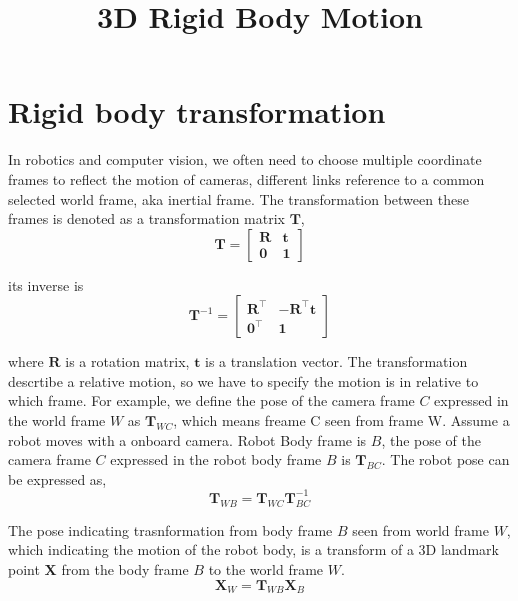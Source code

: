 \documentclass{article}
\title{3D Rigid Body Motion}
\author{}
\date{}
\begin{document}
\maketitle

\section{Rigid body transformation}
In robotics and computer vision, we often need to choose multiple coordinate frames to reflect the motion of cameras, 
different links reference to a common selected world frame, aka inertial frame. The transformation between these frames is denoted as a transformation matrix $\mathbf{T}$,
\begin{equation}
    \mathbf{T} = 
    \begin{bmatrix} 
    \mathbf{R} & \mathbf{t} \\
    \mathbf{0} & \mathbf{1}
    \end{bmatrix}  
\end{equation}

its inverse is
\begin{equation}
\mathbf{T}^{-1} = 
\begin{bmatrix}
\mathbf{R}^{\top} & -\mathbf{R}^{\top}\mathbf{t} \\
\mathbf{0}^{\top} & \mathbf{1}
\end{bmatrix}
\end{equation}

where $\mathbf{R}$ is a rotation matrix, $\mathbf{t}$ is a translation vector. The transformation descrtibe a relative motion, so we have to specify the motion is in relative to which frame.
For example, we define the pose of the camera frame $C$ expressed in the world frame $W$ as $\mathbf{T}_{WC}$, which means freame C seen from frame W. 
Assume a robot moves with a onboard camera. Robot Body frame is $B$, the pose of the camera frame $C$ expressed in the robot body frame $B$ is $\mathbf{T}_{BC}$. 
The robot pose can be expressed as,
\begin{equation}
    \mathbf{T}_{WB} = \mathbf{T}_{WC} \mathbf{T}_{BC}^{-1}
\end{equation}


The pose indicating trasnformation from body frame $B$ seen from world frame $W$, which indicating the motion of the robot body, is a transform of a 3D landmark point $\mathbf{X}$ from the body frame $B$ to the world frame $W$.
\begin{equation}
    \label{eq:inverse_pose}
    \mathbf{X}_W = \mathbf{T}_{WB} \mathbf{X}_B
\end{equation}
\end{document}
